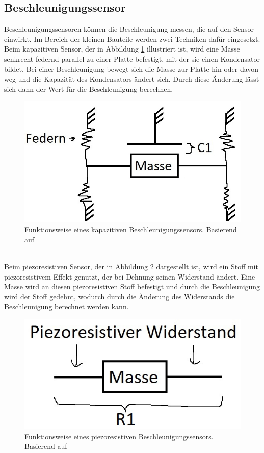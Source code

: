 \subsection{Beschleunigungssensor}
Beschleunigungssensoren können die Beschleunigung messen, die auf den Sensor einwirkt.
Im Bereich der kleinen Bauteile werden zwei Techniken dafür eingesetzt.\\
Beim kapazitiven Sensor, der in Abbildung \ref{fig:pic_accel_kapa} illustriert ist, wird eine Masse senkrecht-federnd parallel zu einer Platte befestigt, mit der sie einen Kondensator bildet.
Bei einer Beschleunigung bewegt sich die Masse zur Platte hin oder davon weg und die Kapazität des Kondensators ändert sich.
Durch diese Änderung lässt sich dann der Wert für die Beschleunigung berechnen. \cite{site_mems}
\begin{figure}[h]
	\centering
	\includegraphics[width=0.33\linewidth]{res/kinAccel.jpg}
	\caption{Funktionsweise eines kapazitiven Beschleunigungssensors. Basierend auf \cite{site_sensorbild}}
	\label{fig:pic_accel_kapa}
\end{figure}\\
Beim piezoresistiven Sensor, der in Abbildung \ref{fig:pic_accel_pie} dargestellt ist, wird ein Stoff mit piezoresistivem Effekt genutzt, der bei Dehnung seinen Widerstand ändert.
Eine Masse wird an diesen piezoresistiven Stoff befestigt und durch die Beschleunigung wird der Stoff gedehnt, wodurch durch die Änderung des Widerstands die Beschleunigung berechnet werden kann. \cite{site_dms}
\begin{figure}[h]
	\centering
	\includegraphics[width=0.25\linewidth]{res/prAccel.jpg}
	\caption{Funktionsweise eines piezoresistiven Beschleunigungssensors. Basierend auf \cite{site_sensorbild}}
	\label{fig:pic_accel_pie}
\end{figure}\\

